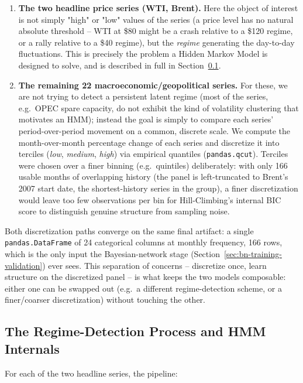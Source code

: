 \begin{enumerate}
  \item \textbf{The two headline price series (WTI, Brent).} Here the
    object of interest is not simply "high" or "low" values of the
    series (a price level has no natural absolute threshold -- WTI at
    \$80 might be a crash relative to a \$120 regime, or a rally
    relative to a \$40 regime), but the \emph{regime} generating the
    day-to-day fluctuations. This is precisely the problem a Hidden
    Markov Model is designed to solve, and is described in full in
    Section~\ref{sec:regime-process}.
  \item \textbf{The remaining 22 macroeconomic/geopolitical series.} For
    these, we are not trying to detect a persistent latent regime (most
    of the series, e.g.\ OPEC spare capacity, do not exhibit the kind of
    volatility clustering that motivates an HMM); instead the goal is
    simply to compare each series' period-over-period movement on a
    common, discrete scale. We compute the month-over-month percentage
    change of each series and discretize it into terciles (\emph{low},
    \emph{medium}, \emph{high}) via empirical quantiles
    (\texttt{pandas.qcut}). Terciles were chosen over a finer binning
    (e.g.\ quintiles) deliberately: with only 166 usable months of
    overlapping history (the panel is left-truncated to Brent's 2007
    start date, the shortest-history series in the group), a finer
    discretization would leave too few observations per bin for
    Hill-Climbing's internal BIC score to distinguish genuine structure
    from sampling noise.
\end{enumerate}

Both discretization paths converge on the same final artifact: a single
\texttt{pandas.DataFrame} of 24 categorical columns at monthly
frequency, 166 rows, which is the only input the Bayesian-network stage
(Section~\ref{sec:bn-training-validation}) ever sees. This separation of
concerns -- discretize once, learn structure on the discretized panel --
is what keeps the two models composable: either one can be swapped out
(e.g.\ a different regime-detection scheme, or a finer/coarser
discretization) without touching the other.

\subsection{The Regime-Detection Process and HMM Internals}
\label{sec:regime-process}

For each of the two headline series, the pipeline:

